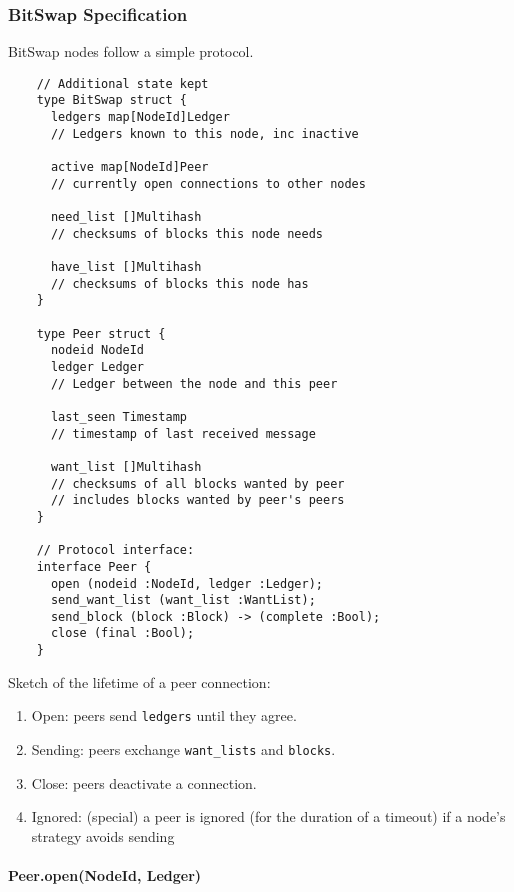 \documentclass{sig-alternate}
\begin{document}
\subsubsection{BitSwap Specification}

BitSwap nodes follow a simple protocol.

\begin{verbatim}
    // Additional state kept
    type BitSwap struct {
      ledgers map[NodeId]Ledger
      // Ledgers known to this node, inc inactive

      active map[NodeId]Peer
      // currently open connections to other nodes

      need_list []Multihash
      // checksums of blocks this node needs

      have_list []Multihash
      // checksums of blocks this node has
    }

    type Peer struct {
      nodeid NodeId
      ledger Ledger
      // Ledger between the node and this peer

      last_seen Timestamp
      // timestamp of last received message

      want_list []Multihash
      // checksums of all blocks wanted by peer
      // includes blocks wanted by peer's peers
    }

    // Protocol interface:
    interface Peer {
      open (nodeid :NodeId, ledger :Ledger);
      send_want_list (want_list :WantList);
      send_block (block :Block) -> (complete :Bool);
      close (final :Bool);
    }
\end{verbatim}


Sketch of the lifetime of a peer connection:
\begin{enumerate}
  \item Open: peers send \texttt{ledgers} until they agree.
  \item Sending: peers exchange \texttt{want\_lists} and \texttt{blocks}.
  \item Close: peers deactivate a connection.
  \item Ignored: (special) a peer is ignored (for the duration of a timeout)
        if a node's strategy avoids sending

\end{enumerate}

\paragraph{Peer.open(NodeId, Ledger)}
\end{document}
